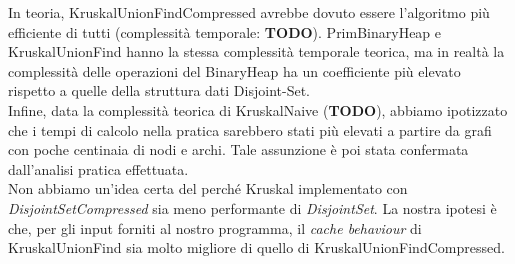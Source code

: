 \noindent In teoria, KruskalUnionFindCompressed avrebbe dovuto essere l'algoritmo più efficiente di tutti (complessità temporale: \textbf{TODO}).
\noindent PrimBinaryHeap e KruskalUnionFind hanno la stessa complessità temporale teorica, ma in realtà la complessità delle operazioni del BinaryHeap ha un coefficiente più elevato rispetto a quelle della struttura dati Disjoint-Set. \\

\noindent Infine, data la complessità teorica di KruskalNaive (\textbf{TODO}), abbiamo ipotizzato che i tempi di calcolo nella pratica sarebbero stati più elevati a partire da grafi con poche centinaia di nodi e archi. Tale assunzione è poi stata confermata dall'analisi pratica effettuata. \\

\noindent Non abbiamo un'idea certa del perché Kruskal implementato con \textit{DisjointSetCompressed} sia meno performante di \textit{DisjointSet}. La nostra ipotesi è che, per gli input forniti al nostro programma, il \textit{cache behaviour} di KruskalUnionFind sia molto migliore di quello di KruskalUnionFindCompressed.
